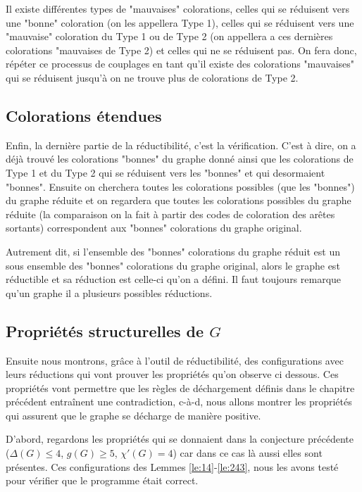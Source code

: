\documentclass[10pt,a4paper]{article}
\begin{document}
Il existe différentes types de "mauvaises" colorations, celles qui se réduisent vers une "bonne" coloration (on les appellera Type 1), celles qui se réduisent vers une "mauvaise" coloration du Type 1 ou de Type 2 (on appellera a ces dernières colorations "mauvaises de Type 2) et celles qui ne se réduisent pas. On fera donc, répéter ce processus de couplages en tant qu'il existe des colorations "mauvaises" qui se réduisent jusqu'à on ne trouve plus de colorations de Type 2.

\subsection{Colorations étendues}

Enfin, la dernière partie de la réductibilité, c'est la vérification. C'est à dire, on a déjà trouvé les colorations "bonnes" du graphe donné ainsi que les colorations de Type 1 et du Type 2 qui se réduisent vers les "bonnes" et qui desormaient "bonnes". Ensuite on cherchera toutes les colorations possibles (que les "bonnes") du graphe réduite et on regardera que toutes les colorations possibles du graphe réduite (la comparaison on la fait à partir des codes de coloration des arêtes sortants) correspondent aux "bonnes" colorations du graphe original. 

Autrement dit, si l'ensemble des "bonnes" colorations du graphe réduit est un sous ensemble des "bonnes" colorations du graphe original, alors le graphe est réductible et sa réduction est celle-ci qu'on a défini. Il faut toujours remarque qu'un graphe il a plusieurs possibles réductions. 
\subsection{Propriétés structurelles de $G$}

Ensuite nous montrons, grâce à l'outil de réductibilité, des configurations avec leurs réductions qui vont prouver les propriétés qu'on observe ci dessous. Ces propriétés vont permettre que les règles de déchargement définis dans le chapitre précédent entraînent une contradiction, c-à-d, nous allons montrer les propriétés qui assurent que le graphe se décharge de manière positive.

D'abord, regardons les propriétés qui se donnaient dans la conjecture précédente ($\Delta(G) \leq 4$, $g(G) \geq 5$, $\chi'(G) =4$) car dans ce cas là aussi elles sont présentes. Ces configurations des Lemmes \ref{le:14}-\ref{le:243}, nous les avons testé pour vérifier que le programme était correct. 
\end{document}

